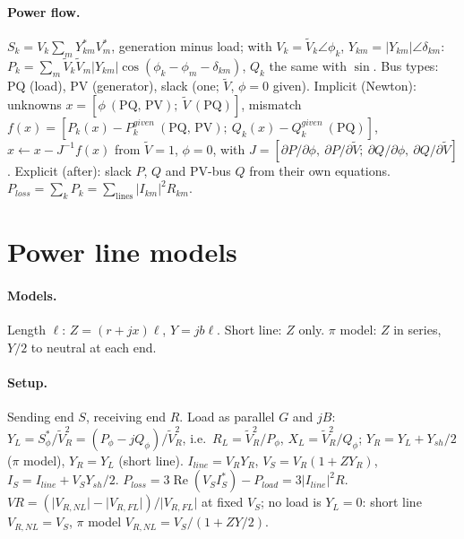 \documentclass{article}
\newcommand{\abs}[1]{\lvert#1\rvert}
\begin{document}
\paragraph{Power flow.}
$S_k = V_k\sum_m Y_{km}^* V_m^*$, generation minus load; with $V_k = \tilde V_k\angle\phi_k$, $Y_{km} = \abs{Y_{km}}\angle\delta_{km}$: $P_k = \sum_m \tilde V_k\tilde V_m\abs{Y_{km}}\cos(\phi_k - \phi_m - \delta_{km})$, $Q_k$ the same with $\sin$.
Bus types: PQ (load), PV (generator), slack (one; $\tilde V$, $\phi = 0$ given).
Implicit (Newton): unknowns $x = [\phi\ (\text{PQ, PV});\ \tilde V\ (\text{PQ})]$, mismatch $f(x) = [P_k(x) - P_k^{given}\ (\text{PQ, PV});\ Q_k(x) - Q_k^{given}\ (\text{PQ})]$, $x \leftarrow x - J^{-1}f(x)$ from $\tilde V = 1$, $\phi = 0$, with $J = [\partial P/\partial\phi,\ \partial P/\partial\tilde V;\ \partial Q/\partial\phi,\ \partial Q/\partial\tilde V]$.
Explicit (after): slack $P$, $Q$ and PV-bus $Q$ from their own equations.
$P_{loss} = \sum_k P_k = \sum_{\text{lines}}\abs{I_{km}}^2 R_{km}$.



\section{Power line models}
\paragraph{Models.}
Length $\ell$: $Z = (r + jx)\ell$, $Y = jb\ell$.
Short line: $Z$ only.
$\pi$ model: $Z$ in series, $Y/2$ to neutral at each end.

\paragraph{Setup.}
Sending end $S$, receiving end $R$.
Load as parallel $G$ and $jB$: $Y_L = S_\phi^*/\tilde V_R^2 = (P_\phi - jQ_\phi)/\tilde V_R^2$, i.e.\ $R_L = \tilde V_R^2/P_\phi$, $X_L = \tilde V_R^2/Q_\phi$; $Y_R = Y_L + Y_{sh}/2$ ($\pi$ model), $Y_R = Y_L$ (short line).
$I_{line} = V_R Y_R$, $V_S = V_R(1 + ZY_R)$, $I_S = I_{line} + V_S Y_{sh}/2$.
$P_{loss} = 3\operatorname{Re}(V_S I_S^*) - P_{load} = 3\abs{I_{line}}^2 R$.
$VR = (\abs{V_{R,NL}} - \abs{V_{R,FL}})/\abs{V_{R,FL}}$ at fixed $V_S$; no load is $Y_L = 0$: short line $V_{R,NL} = V_S$, $\pi$ model $V_{R,NL} = V_S/(1 + ZY/2)$.
\end{document}

